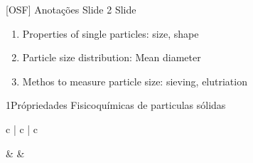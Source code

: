 \documentclass["./OSF-Slides_annotations.tex"]{subfiles}
\begin{document}
[OSF]
{Anotações Slide 2} %
{Slide} %

\begin{enumerate}[label ={\arabic{part}.\arabic{enumi}}]
    \item Properties of single particles: size, shape
    \item Particle size distribution: Mean diameter
    \item Methos to measure particle size: sieving, elutriation
\end{enumerate}

\begin{sectionBox}1{Própriedades Fisicoquímicas de particulas sólidas} %
    
    \setlength\tabcolsep{2mm}        %
    \renewcommand\arraystretch{1.25} %

    \begin{table}[H]\centering
        \begin{tabular}{c | c | c}
            
            \toprule
            
            &   
            &   
            
            \\[1.5em]
                

\end{tabular}
\end{table}
\end{sectionBox}
\end{document}
